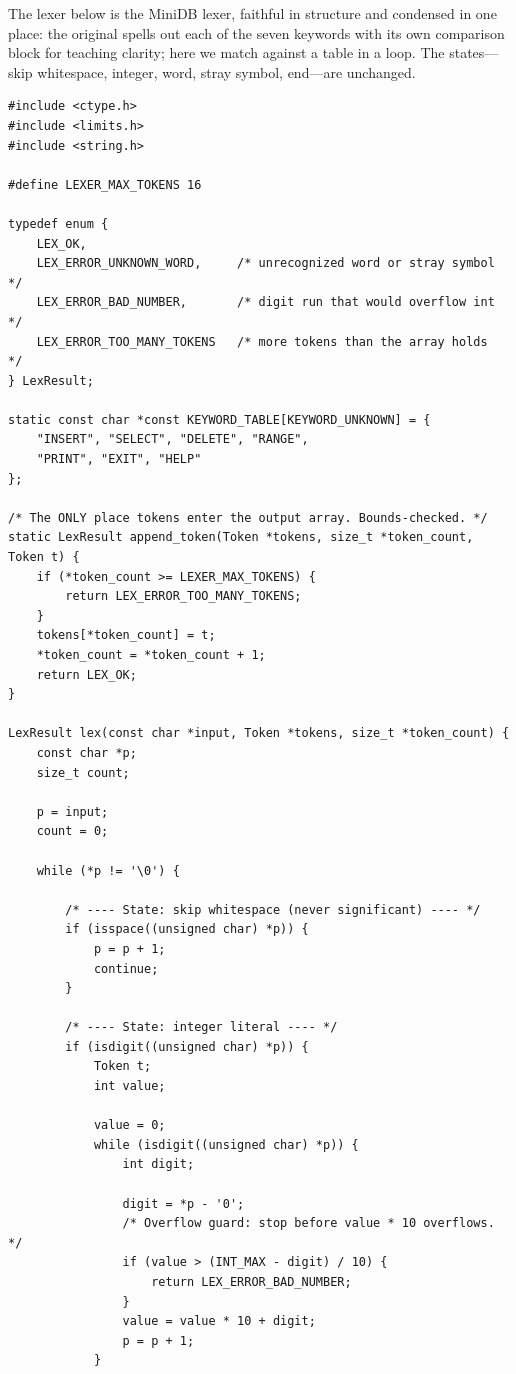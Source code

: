 The lexer below is the MiniDB lexer, faithful in structure and
condensed in one place: the original spells out each of the seven
keywords with its own comparison block for teaching clarity; here we
match against a table in a loop. The states---skip whitespace,
integer, word, stray symbol, end---are unchanged.

\begin{lstlisting}[caption={The MiniDB lexer (condensed from lexer.c).}]
#include <ctype.h>
#include <limits.h>
#include <string.h>

#define LEXER_MAX_TOKENS 16

typedef enum {
    LEX_OK,
    LEX_ERROR_UNKNOWN_WORD,     /* unrecognized word or stray symbol  */
    LEX_ERROR_BAD_NUMBER,       /* digit run that would overflow int  */
    LEX_ERROR_TOO_MANY_TOKENS   /* more tokens than the array holds   */
} LexResult;

static const char *const KEYWORD_TABLE[KEYWORD_UNKNOWN] = {
    "INSERT", "SELECT", "DELETE", "RANGE",
    "PRINT", "EXIT", "HELP"
};

/* The ONLY place tokens enter the output array. Bounds-checked. */
static LexResult append_token(Token *tokens, size_t *token_count, Token t) {
    if (*token_count >= LEXER_MAX_TOKENS) {
        return LEX_ERROR_TOO_MANY_TOKENS;
    }
    tokens[*token_count] = t;
    *token_count = *token_count + 1;
    return LEX_OK;
}

LexResult lex(const char *input, Token *tokens, size_t *token_count) {
    const char *p;
    size_t count;

    p = input;
    count = 0;

    while (*p != '\0') {

        /* ---- State: skip whitespace (never significant) ---- */
        if (isspace((unsigned char) *p)) {
            p = p + 1;
            continue;
        }

        /* ---- State: integer literal ---- */
        if (isdigit((unsigned char) *p)) {
            Token t;
            int value;

            value = 0;
            while (isdigit((unsigned char) *p)) {
                int digit;

                digit = *p - '0';
                /* Overflow guard: stop before value * 10 overflows. */
                if (value > (INT_MAX - digit) / 10) {
                    return LEX_ERROR_BAD_NUMBER;
                }
                value = value * 10 + digit;
                p = p + 1;
            }


\end{lstlisting}
